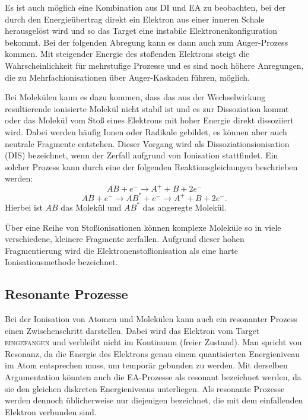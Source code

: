 Es ist auch möglich eine Kombination aus DI und EA zu beobachten, bei der durch den Energieübertrag direkt ein Elektron aus einer inneren Schale herausgelöst wird und so das Target eine instabile Elektronenkonfiguration bekommt. Bei der folgenden Abregung kann es dann auch zum Auger-Prozess kommen. Mit steigender Energie des stoßenden Elektrons steigt die Wahrscheinlichkeit für mehrstufige Prozesse und es sind noch höhere Anregungen, die zu Mehrfachionisationen über Auger-Kaskaden führen, möglich.

Bei Molekülen kann es dazu kommen, dass das aus der Wechselwirkung resultierende ionisierte Molekül nicht stabil ist und es zur Dissoziation kommt oder das Molekül vom Stoß eines Elektrons mit hoher Energie direkt dissoziiert wird. Dabei werden häufig Ionen oder Radikale gebildet, es können aber auch neutrale Fragmente entstehen. Dieser Vorgang wird als Dissoziationsionisation (DIS) bezeichnet, wenn der Zerfall aufgrund von Ionisation stattfindet. Ein solcher Prozess kann durch eine der folgenden Reaktionsgleichungen beschrieben werden:
\begin{equation}
    AB + e^- \rightarrow A^{+} + B + 2e^-
\end{equation}
\begin{equation}
    AB + e^- \rightarrow AB^* + e^- \rightarrow A^{+} + B + 2e^-.
\end{equation} 
Hierbei ist $AB$ das Molekül und $AB^*$ das angeregte Molekül.

Über eine Reihe von Stoßionisationen können komplexe Moleküle so in viele verschiedene, kleinere Fragmente zerfallen. Aufgrund dieser hohen Fragmentierung wird die Elektronenstoßionisation als eine harte Ionisationsmethode bezeichnet.

\subsection{Resonante Prozesse}
Bei der Ionisation von Atomen und Molekülen kann auch ein resonanter Prozess einen Zwischenschritt darstellen. Dabei wird das Elektron vom Target \textsc{eingefangen} und verbleibt nicht im Kontinuum (freier Zustand). Man spricht von Resonanz, da die Energie des Elektrons genau einem quantisierten Energieniveau im Atom entsprechen muss, um temporär gebunden zu werden. Mit derselben Argumentation könnten auch die EA-Prozesse als resonant bezeichnet werden, da sie den gleichen diskreten Energieniveaus unterliegen. Als resonante Prozesse werden dennoch üblicherweise nur diejenigen bezeichnet, die mit dem einfallenden Elektron verbunden sind.

